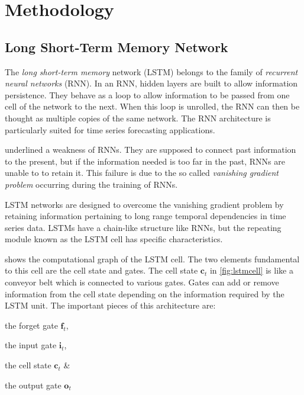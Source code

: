 \section{Methodology}\label{sec:methodgpnn}

\subsection{Long Short-Term Memory Network}\label{sec:lstmintro}

The \emph{long short-term memory} network (LSTM) belongs to the family of \emph{recurrent neural networks} (RNN). 
In an RNN, hidden layers are built to allow information persistence. They behave as a loop to allow information 
to be passed from one cell of the network to the next. When this loop is unrolled, the RNN can then be thought 
as multiple copies of the same network. The RNN architecture is particularly suited for time series forecasting 
applications. 

\citet{hochreiter1991untersuchungen,bengio1994learning} underlined a weakness of RNNs. They are supposed to connect 
past information to the present, but if the information needed is too far in the past, RNNs are unable to to retain it. 
This failure is due to the so called \emph{vanishing gradient problem} occurring during the training of RNNs. 

LSTM networks are designed to overcome the vanishing gradient problem by retaining information pertaining to long range 
temporal dependencies in time series data. LSTMs have a chain-like structure like RNNs, but the repeating module 
known as the LSTM cell has specific characteristics.

 shows the computational graph of the LSTM cell. The two elements 
fundamental to this cell are the cell state and gates. The cell state $\mathbf{c}_{t}$ in \cref{fig:lstmcell} 
is like a conveyor belt which is connected to various gates. Gates can add or remove information from the cell 
state depending on the information required by the LSTM unit. The important pieces of this architecture are: 
\begin{enumerate*} 
	\item the forget gate $\mathbf{f}_t$,
	\item the input gate $\mathbf{i}_t$, 
	\item the cell state $\mathbf{c}_t$ \& 
	\item the output gate $\mathbf{o}_t$  
\end{enumerate*}  

